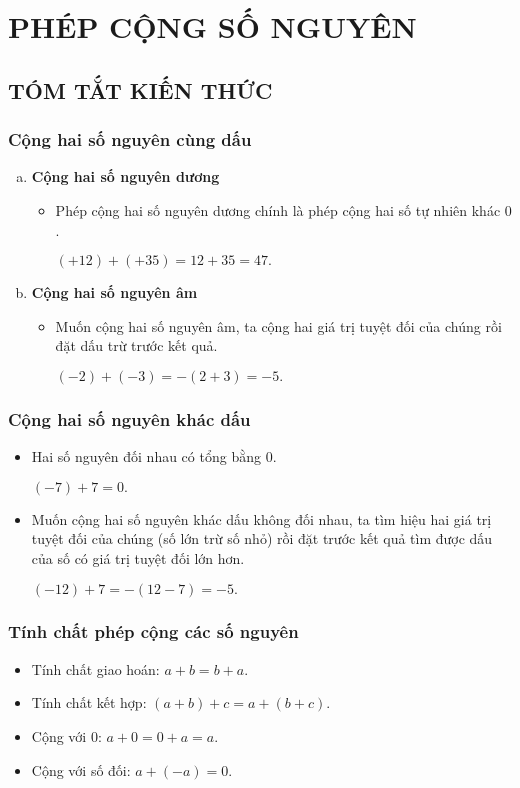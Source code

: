 \section{PHÉP CỘNG SỐ NGUYÊN}
\subsection{TÓM TẮT KIẾN THỨC}
\begin{tomtat}
	\subsubsection{Cộng hai số nguyên cùng dấu}
\begin{enumerate}[a.]
\item \textbf{ Cộng hai số nguyên dương}
\begin{itemize}
\item Phép cộng hai số nguyên dương chính là phép cộng hai số tự nhiên khác $0$.\\
\begin{vd} $(+12) + (+35) = 12+35= 47.$
\end{vd}
\end{itemize}
\item \textbf{ Cộng hai số nguyên âm}
\begin{itemize}
\item Muốn cộng hai số nguyên âm, ta cộng hai giá trị tuyệt đối của chúng rồi đặt dấu trừ trước kết quả.\\
\begin{vd} $(-2) + (-3) = -(2+3)= -5.$
\end{vd}
\end{itemize}
\end{enumerate}
	\subsubsection{Cộng hai số nguyên khác dấu}
\begin{itemize}
\item Hai số nguyên đối nhau có tổng bằng $0$.\\
\begin{vd}  $(-7) + 7= 0.$
\end{vd}
\item Muốn cộng hai số nguyên khác dấu không đối nhau, ta tìm hiệu hai giá trị tuyệt đối của chúng (số lớn trừ số nhỏ) rồi đặt trước kết quả tìm được dấu của số có giá trị tuyệt đối lớn hơn.\\
\begin{vd} $(-12) + 7 = - (12-7)= - 5.$
\end{vd}
\end{itemize}
	\subsubsection{Tính chất phép cộng các số nguyên}
\begin{itemize}
\item Tính chất giao hoán: $a+b =b+a.$
\item Tính chất kết hợp: $(a+b)+c= a + (b+c)$.
\item Cộng với $0$: $a+0 =0+a =a.$
\item Cộng với số đối: $a+(-a)= 0$.
\end{itemize}
\end{tomtat}
